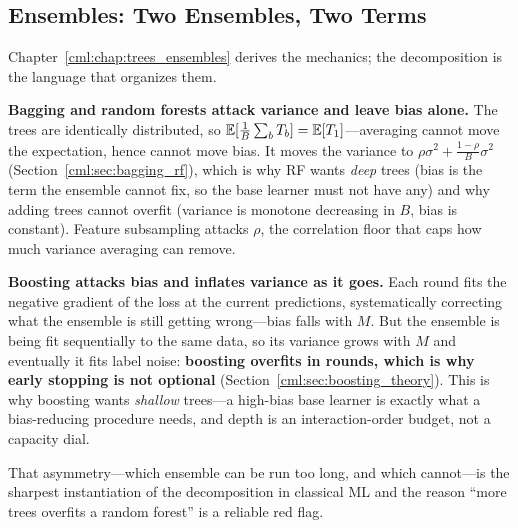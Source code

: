 \subsection{Ensembles: Two Ensembles, Two Terms}

Chapter~\ref{cml:chap:trees_ensembles} derives the mechanics; the decomposition is the language that organizes them.

\textbf{Bagging and random forests attack variance and leave bias alone.} The trees are identically distributed, so $\operatorname{\mathbb{E}}[\frac{1}{B}\sum_b T_b] = \operatorname{\mathbb{E}}[T_1]$---averaging cannot move the expectation, hence cannot move bias. It moves the variance to $\rho\sigma^2 + \frac{1-\rho}{B}\sigma^2$ (Section~\ref{cml:sec:bagging_rf}), which is why RF wants \textit{deep} trees (bias is the term the ensemble cannot fix, so the base learner must not have any) and why adding trees cannot overfit (variance is monotone decreasing in $B$, bias is constant). Feature subsampling attacks $\rho$, the correlation floor that caps how much variance averaging can remove.

\textbf{Boosting attacks bias and inflates variance as it goes.} Each round fits the negative gradient of the loss at the current predictions, systematically correcting what the ensemble is still getting wrong---bias falls with $M$. But the ensemble is being fit sequentially to the same data, so its variance grows with $M$ and eventually it fits label noise: \textbf{boosting overfits in rounds, which is why early stopping is not optional} (Section~\ref{cml:sec:boosting_theory}). This is why boosting wants \textit{shallow} trees---a high-bias base learner is exactly what a bias-reducing procedure needs, and depth is an interaction-order budget, not a capacity dial.

That asymmetry---which ensemble can be run too long, and which cannot---is the sharpest instantiation of the decomposition in classical ML and the reason ``more trees overfits a random forest'' is a reliable red flag.

